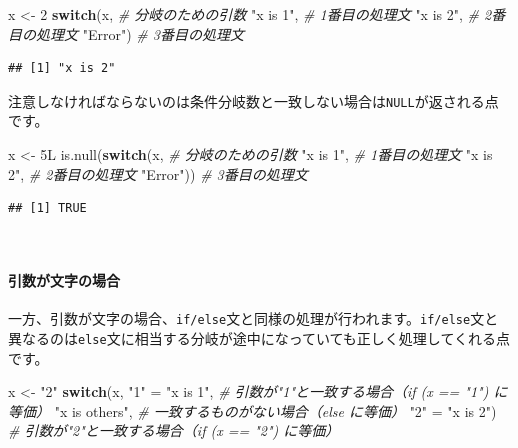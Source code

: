 \documentclass[
  12pt,
]{book}
\newenvironment{Shaded}{\begin{snugshade}}{\end{snugshade}}
\newcommand{\CommentTok}[1]{\textcolor[rgb]{0.56,0.35,0.01}{\textit{#1}}}
\newcommand{\ControlFlowTok}[1]{\textcolor[rgb]{0.13,0.29,0.53}{\textbf{#1}}}
\newcommand{\DecValTok}[1]{\textcolor[rgb]{0.00,0.00,0.81}{#1}}
\newcommand{\FunctionTok}[1]{\textcolor[rgb]{0.00,0.00,0.00}{#1}}
\newcommand{\NormalTok}[1]{#1}
\newcommand{\OtherTok}[1]{\textcolor[rgb]{0.56,0.35,0.01}{#1}}
\newcommand{\StringTok}[1]{\textcolor[rgb]{0.31,0.60,0.02}{#1}}
\begin{document}
\begin{Shaded}
\begin{Highlighting}[numbers=left,,]
\NormalTok{x }\OtherTok{\textless{}{-}} \DecValTok{2}
\ControlFlowTok{switch}\NormalTok{(x,                 }\CommentTok{\# 分岐のための引数}
       \StringTok{"x is 1"}\NormalTok{,          }\CommentTok{\# 1番目の処理文}
       \StringTok{"x is 2"}\NormalTok{,          }\CommentTok{\# 2番目の処理文}
       \StringTok{"Error"}\NormalTok{)           }\CommentTok{\# 3番目の処理文}
\end{Highlighting}
\end{Shaded}

\begin{verbatim}
## [1] "x is 2"
\end{verbatim}

注意しなければならないのは条件分岐数と一致しない場合は\texttt{NULL}が返される点です。

\begin{Shaded}
\begin{Highlighting}[numbers=left,,]
\NormalTok{x }\OtherTok{\textless{}{-}}\NormalTok{ 5L}
\FunctionTok{is.null}\NormalTok{(}\ControlFlowTok{switch}\NormalTok{(x,         }\CommentTok{\# 分岐のための引数}
               \StringTok{"x is 1"}\NormalTok{,  }\CommentTok{\# 1番目の処理文}
               \StringTok{"x is 2"}\NormalTok{,  }\CommentTok{\# 2番目の処理文}
               \StringTok{"Error"}\NormalTok{))  }\CommentTok{\# 3番目の処理文}
\end{Highlighting}
\end{Shaded}

\begin{verbatim}
## [1] TRUE
\end{verbatim}

　

\hypertarget{ux5f15ux6570ux304cux6587ux5b57ux306eux5834ux5408}{%
\paragraph{引数が文字の場合}\label{ux5f15ux6570ux304cux6587ux5b57ux306eux5834ux5408}}

一方、引数が文字の場合、\texttt{if/else}文と同様の処理が行われます。\texttt{if/else}文と異なるのは\texttt{else}文に相当する分岐が途中になっていても正しく処理してくれる点です。

\begin{Shaded}
\begin{Highlighting}[numbers=left,,]
\NormalTok{x }\OtherTok{\textless{}{-}} \StringTok{"2"}
\ControlFlowTok{switch}\NormalTok{(x,}
       \StringTok{"1"} \OtherTok{=} \StringTok{"x is 1"}\NormalTok{,    }\CommentTok{\# 引数が"1"と一致する場合（\textasciigrave{}if (x == "1")\textasciigrave{} に等価）}
       \StringTok{"x is others"}\NormalTok{,     }\CommentTok{\# 一致するものがない場合（\textasciigrave{}else\textasciigrave{} に等価）}
       \StringTok{"2"} \OtherTok{=} \StringTok{"x is 2"}\NormalTok{)    }\CommentTok{\# 引数が"2"と一致する場合（\textasciigrave{}if (x == "2")\textasciigrave{} に等価）}
\end{Highlighting}
\end{Shaded}
\end{document}
